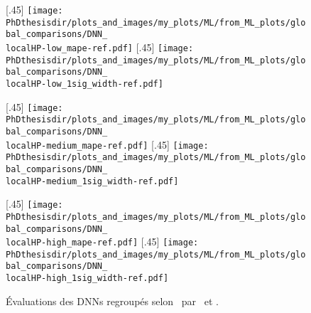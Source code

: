 \begin{figure}[p]
\centering

\subcaptionbox{\label{subfig-\localHP-low_mape}}[.45\textwidth]
{\texttt{[image: \\PhDthesisdir/plots\_and\_images/my\_plots/ML/from\_ML\_plots/global\_comparisons/DNN\_\\localHP-low\_mape-ref.pdf]}\vspace{-\baselineskip}}
\hfill
\subcaptionbox{\label{subfig-\localHP-low_1sigma}}[.45\textwidth]
{\texttt{[image: \\PhDthesisdir/plots\_and\_images/my\_plots/ML/from\_ML\_plots/global\_comparisons/DNN\_\\localHP-low\_1sig\_width-ref.pdf]}\vspace{-\baselineskip}}

\subcaptionbox{\label{subfig-\localHP-medium_mape}}[.45\textwidth]
{\texttt{[image: \\PhDthesisdir/plots\_and\_images/my\_plots/ML/from\_ML\_plots/global\_comparisons/DNN\_\\localHP-medium\_mape-ref.pdf]}\vspace{-\baselineskip}}
\hfill
\subcaptionbox{\label{subfig-\localHP-medium_1sigma}}[.45\textwidth]
{\texttt{[image: \\PhDthesisdir/plots\_and\_images/my\_plots/ML/from\_ML\_plots/global\_comparisons/DNN\_\\localHP-medium\_1sig\_width-ref.pdf]}\vspace{-\baselineskip}}

\subcaptionbox{\label{subfig-\localHP-high_mape}}[.45\textwidth]
{\texttt{[image: \\PhDthesisdir/plots\_and\_images/my\_plots/ML/from\_ML\_plots/global\_comparisons/DNN\_\\localHP-high\_mape-ref.pdf]}\vspace{-\baselineskip}}
\hfill
\subcaptionbox{\label{subfig-\localHP-high_1sigma}}[.45\textwidth]
{\texttt{[image: \\PhDthesisdir/plots\_and\_images/my\_plots/ML/from\_ML\_plots/global\_comparisons/DNN\_\\localHP-high\_1sig\_width-ref.pdf]}\vspace{-\baselineskip}}

\caption{Évaluations des DNNs regroupés selon \localHPlong\ par \LossMAPE\ et \OneSigmaWidth.}
\label{fig-\localHP}
\end{figure}
